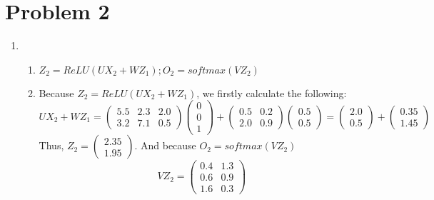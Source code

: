 \documentclass[english]{article}
\begin{document}
\section*{Problem 2}
\begin{enumerate}
    \item \begin{enumerate}
        \item $Z_2 = ReLU(UX_2+WZ_1); O_2 = softmax(VZ_2)$
        \item Because $Z_2 = ReLU(UX_2+WZ_1)$, we firstly calculate the following:
        \[
         UX_2+WZ_1 = 
         \begin{pmatrix}
                 5.5 & 2.3 & 2.0 \\
                 3.2 & 7.1 & 0.5
         \end{pmatrix}
         \begin{pmatrix}
                 0 \\
                 0 \\
                 1
         \end{pmatrix}
         +
         \begin{pmatrix}
                 0.5 & 0.2 \\
                 2.0 & 0.9
         \end{pmatrix}
         \begin{pmatrix}
                 0.5 \\
                 0.5
         \end{pmatrix}
         =
         \begin{pmatrix}
                 2.0 \\
                 0.5
         \end{pmatrix}
         +
         \begin{pmatrix}
                 0.35 \\
                 1.45
         \end{pmatrix}
        \]
        Thus, $Z_2 = 
        \begin{pmatrix}
                 2.35 \\
                 1.95
         \end{pmatrix}$. And because $O_2 = softmax(VZ_2)$
         \[
         VZ_2 =
         \begin{pmatrix}
                 0.4 & 1.3 \\
                 0.6 & 0.9 \\
                 1.6 & 0.3
         \end{pmatrix}
\]
\end{enumerate}
\end{enumerate}
\end{document}
